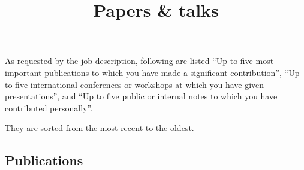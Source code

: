 \documentclass[10pt, a4paper, sans]{moderncv}
\title{Papers \& talks}
\begin{document}
\fancyfoot[RF]{}

As requested by the job description, following are listed \enquote{Up to five
most important publications to which you have made a significant contribution},
\enquote{Up to five international conferences or workshops at which you have
given presentations}, and \enquote{Up to five public or internal notes to which
you have contributed personally}.

They are sorted from the most recent to the oldest.

\begin{multicols}{2}

\section{Publications}


\end{multicols}
\end{document}

